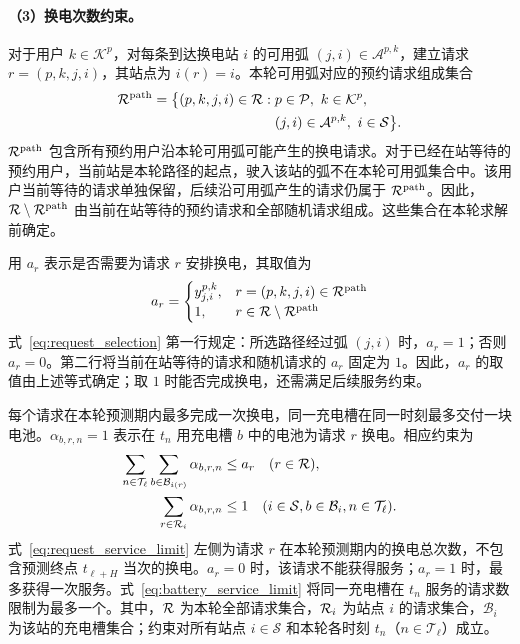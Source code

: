 \paragraph{（3）换电次数约束。}
对于用户 $k\in\mathcal K^p$，对每条到达换电站 $i$ 的可用弧 $(j,i)\in\mathcal A^{p,k}$，建立请求 $r=(p,k,j,i)$，其站点为 $i(r)=i$。本轮可用弧对应的预约请求组成集合
\[
\begin{aligned}
\mathcal R^{\mathrm{path}}=\bigl\{(p,k,j,i)\in\mathcal R:\;&
p\in\mathcal P,\ k\in\mathcal K^p,\\
&(j,i)\in\mathcal A^{p,k},\ i\in\mathcal S\bigr\}.
\end{aligned}
\]
$\mathcal R^{\mathrm{path}}$ 包含所有预约用户沿本轮可用弧可能产生的换电请求。对于已经在站等待的预约用户，当前站是本轮路径的起点，驶入该站的弧不在本轮可用弧集合中。该用户当前等待的请求单独保留，后续沿可用弧产生的请求仍属于 $\mathcal R^{\mathrm{path}}$。因此，$\mathcal R\setminus\mathcal R^{\mathrm{path}}$ 由当前在站等待的预约请求和全部随机请求组成。这些集合在本轮求解前确定。

用 $a_r$ 表示是否需要为请求 $r$ 安排换电，其取值为
\begin{equation}
a_r=\begin{cases}
y_{j,i}^{p,k},&r=(p,k,j,i)\in\mathcal R^{\mathrm{path}}\\
1,&r\in\mathcal R\setminus\mathcal R^{\mathrm{path}}
\end{cases}
\label{eq:request_selection}
\end{equation}
式~\eqref{eq:request_selection} 第一行规定：所选路径经过弧 $(j,i)$ 时，$a_r=1$；否则 $a_r=0$。第二行将当前在站等待的请求和随机请求的 $a_r$ 固定为 $1$。因此，$a_r$ 的取值由上述等式确定；取 $1$ 时能否完成换电，还需满足后续服务约束。

每个请求在本轮预测期内最多完成一次换电，同一充电槽在同一时刻最多交付一块电池。$\alpha_{b,r,n}=1$ 表示在 $t_n$ 用充电槽 $b$ 中的电池为请求 $r$ 换电。相应约束为
\begin{subequations}\label{eq:assignment_capacity}
\begin{align}
\sum_{n\in\mathcal T_\ell}
\sum_{b\in\mathcal B_{i(r)}}\alpha_{b,r,n}
&\le a_r\quad(r\in\mathcal R),\label{eq:request_service_limit}\\
\sum_{r\in\mathcal R_i}\alpha_{b,r,n}&\le1
\quad(i\in\mathcal S,b\in\mathcal B_i,n\in\mathcal T_\ell).
\label{eq:battery_service_limit}
\end{align}
\end{subequations}
式~\eqref{eq:request_service_limit} 左侧为请求 $r$ 在本轮预测期内的换电总次数，不包含预测终点 $t_{\ell+H}$ 当次的换电。$a_r=0$ 时，该请求不能获得服务；$a_r=1$ 时，最多获得一次服务。式~\eqref{eq:battery_service_limit} 将同一充电槽在 $t_n$ 服务的请求数限制为最多一个。其中，$\mathcal R$ 为本轮全部请求集合，$\mathcal R_i$ 为站点 $i$ 的请求集合，$\mathcal B_i$ 为该站的充电槽集合；约束对所有站点 $i\in\mathcal S$ 和本轮各时刻 $t_n$（$n\in\mathcal T_\ell$）成立。

